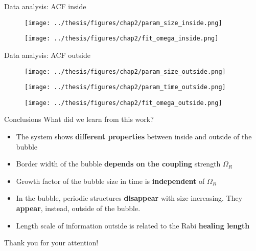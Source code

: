 \documentclass[handout]{beamer}
\newcommand{\backupbegin}{
    \newcounter{finalframe}
    \setcounter{finalframe}{\value{framenumber}}
}
\newcommand{\backupend}{
    \setcounter{framenumber}{\value{finalframe}}
}
\begin{document}
\begin{frame}{Data analysis: ACF inside}
    \begin{figure}
        \centering
        \texttt{[image: ../thesis/figures/chap2/param\_size\_inside.png]}
    \end{figure}
    \vspace{-0.5cm}
    \begin{figure}
        \centering
        \texttt{[image: ../thesis/figures/chap2/fit\_omega\_inside.png]}
    \end{figure}
\end{frame}

\begin{frame}{Data analysis: ACF outside}
    \begin{figure}
        \centering
        \begin{minipage}[t]{0.47 \textwidth}
            \centering
            \texttt{[image: ../thesis/figures/chap2/param\_size\_outside.png]}
        \end{minipage}
        \hspace{0.02\textwidth}
        \begin{minipage}[t]{0.47 \textwidth}
            \centering
            \texttt{[image: ../thesis/figures/chap2/param\_time\_outside.png]}
        \end{minipage}
    \end{figure}
    \vspace{-0.5cm}
    \begin{figure}
        \centering
        \texttt{[image: ../thesis/figures/chap2/fit\_omega\_outside.png]}
    \end{figure}
\end{frame}

\begin{frame}{Conclusions}
    What did we learn from this work?
    \begin{itemize}
        \item The system shows \textbf{different properties} between inside and outside of the bubble
        \item Border width of the bubble \textbf{depends on the coupling} strength $\Omega_R$
        \item Growth factor of the bubble size in time is \textbf{independent} of $\Omega_R$
        \item In the bubble, periodic structures \textbf{disappear} with size increasing. They \textbf{appear}, instead, outside of the bubble.
        \item Length scale of information outside is related to the Rabi \textbf{healing length}
    \end{itemize}
\end{frame}

\begin{frame}
    \huge
    Thank you for your attention!
\end{frame}

    
\end{document}
